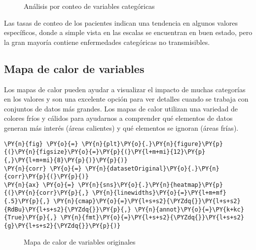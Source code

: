 \begin{center}
    	\begin{figure}[H]
	\centering
	\caption{Análisis por conteo de variables categóricas}
	\label{fig:acvc}
	\end{figure}
\end{center}
    
    Las tasas de conteo de los pacientes indican una tendencia en algunos
valores específicos, donde a simple vista en las escalas se encuentran
en buen estado, pero la gran mayoría contiene enfermedades categóricas
no transmisibles.



    \hypertarget{mapa-de-calor-de-variables}{%
\subsection{Mapa de calor de
variables}\label{mapa-de-calor-de-variables}}

Los mapas de calor pueden ayudar a visualizar el impacto de muchas
categorías en los valores y son una excelente opción para ver detalles
cuando se trabaja con conjuntos de datos más grandes. Los mapas de calor
utilizan una variedad de colores fríos y cálidos para ayudarnos a
comprender qué elementos de datos generan más interés (áreas calientes)
y qué elementos se ignoran (áreas frías).

    \begin{tcolorbox}[breakable, size=fbox, boxrule=1pt, pad at break*=1mm,colback=cellbackground, colframe=cellborder]
\begin{Verbatim}[commandchars=\\\{\}]
\PY{n}{fig} \PY{o}{=} \PY{n}{plt}\PY{o}{.}\PY{n}{figure}\PY{p}{(}\PY{n}{figsize}\PY{o}{=}\PY{p}{(}\PY{l+m+mi}{12}\PY{p}{,}\PY{l+m+mi}{8}\PY{p}{)}\PY{p}{)}
\PY{n}{corr} \PY{o}{=} \PY{n}{datasetOriginal}\PY{o}{.}\PY{n}{corr}\PY{p}{(}\PY{p}{)}
\PY{n}{ax} \PY{o}{=} \PY{n}{sns}\PY{o}{.}\PY{n}{heatmap}\PY{p}{(}\PY{n}{corr}\PY{p}{,} \PY{n}{linewidths}\PY{o}{=}\PY{l+m+mf}{.5}\PY{p}{,} \PY{n}{cmap}\PY{o}{=}\PY{l+s+s2}{\PYZdq{}}\PY{l+s+s2}{RdBu}\PY{l+s+s2}{\PYZdq{}}\PY{p}{,} \PY{n}{annot}\PY{o}{=}\PY{k+kc}{True}\PY{p}{,} \PY{n}{fmt}\PY{o}{=}\PY{l+s+s2}{\PYZdq{}}\PY{l+s+s2}{g}\PY{l+s+s2}{\PYZdq{}}\PY{p}{)}
\end{Verbatim}
\end{tcolorbox}

    \begin{center}
    \begin{figure}[H]
    \centering
    \caption{Mapa de calor de variables originales}
    \label{fig:mcvo}
		\end{figure}
    \end{center}

